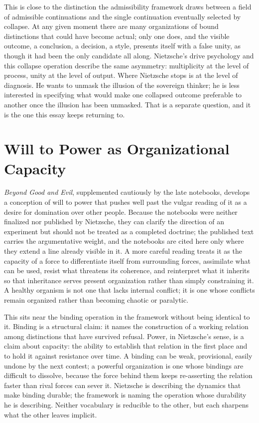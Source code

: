 \documentclass[11pt]{article}
\begin{document}
This is close to the distinction the admissibility framework draws between a field of admissible continuations and the single continuation eventually selected by collapse. At any given moment there are many organizations of bound distinctions that could have become actual; only one does, and the visible outcome, a conclusion, a decision, a style, presents itself with a false unity, as though it had been the only candidate all along. Nietzsche's drive psychology and this collapse operation describe the same asymmetry: multiplicity at the level of process, unity at the level of output. Where Nietzsche stops is at the level of diagnosis. He wants to unmask the illusion of the sovereign thinker; he is less interested in specifying what would make one collapsed outcome preferable to another once the illusion has been unmasked. That is a separate question, and it is the one this essay keeps returning to.

\section*{Will to Power as Organizational Capacity}

\emph{Beyond Good and Evil}, supplemented cautiously by the late notebooks, develops a conception of will to power that pushes well past the vulgar reading of it as a desire for domination over other people. Because the notebooks were neither finalized nor published by Nietzsche, they can clarify the direction of an experiment but should not be treated as a completed doctrine; the published text carries the argumentative weight, and the notebooks are cited here only where they extend a line already visible in it. A more careful reading treats it as the capacity of a force to differentiate itself from surrounding forces, assimilate what can be used, resist what threatens its coherence, and reinterpret what it inherits so that inheritance serves present organization rather than simply constraining it. A healthy organism is not one that lacks internal conflict; it is one whose conflicts remain organized rather than becoming chaotic or paralytic.

This sits near the binding operation in the framework without being identical to it. Binding is a structural claim: it names the construction of a working relation among distinctions that have survived refusal. Power, in Nietzsche's sense, is a claim about capacity: the ability to establish that relation in the first place and to hold it against resistance over time. A binding can be weak, provisional, easily undone by the next contest; a powerful organization is one whose bindings are difficult to dissolve, because the force behind them keeps re-asserting the relation faster than rival forces can sever it. Nietzsche is describing the dynamics that make binding durable; the framework is naming the operation whose durability he is describing. Neither vocabulary is reducible to the other, but each sharpens what the other leaves implicit.
\end{document}
